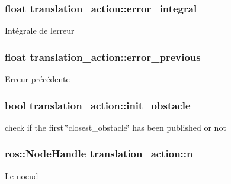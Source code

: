 \subsubsection[{\texorpdfstring{error\+\_\+integral}{error_integral}}]{\setlength{\rightskip}{0pt plus 5cm}float translation\+\_\+action\+::error\+\_\+integral\hspace{0.3cm}{\ttfamily [private]}}\hypertarget{classtranslation__action_a08c753f34a47c55ae61a7e2f1533b3cf}{}\label{classtranslation__action_a08c753f34a47c55ae61a7e2f1533b3cf}
Intégrale de l\textquotesingle{}erreur 
\subsubsection[{\texorpdfstring{error\+\_\+previous}{error_previous}}]{\setlength{\rightskip}{0pt plus 5cm}float translation\+\_\+action\+::error\+\_\+previous\hspace{0.3cm}{\ttfamily [private]}}\hypertarget{classtranslation__action_aa3ac2f4fc74779444d7dcf4c6b92ec11}{}\label{classtranslation__action_aa3ac2f4fc74779444d7dcf4c6b92ec11}
Erreur précédente 
\subsubsection[{\texorpdfstring{init\+\_\+obstacle}{init_obstacle}}]{\setlength{\rightskip}{0pt plus 5cm}bool translation\+\_\+action\+::init\+\_\+obstacle\hspace{0.3cm}{\ttfamily [private]}}\hypertarget{classtranslation__action_a27a6e128fa79d4e87a4d28f5fcb163dc}{}\label{classtranslation__action_a27a6e128fa79d4e87a4d28f5fcb163dc}
check if the first \char`\"{}closest\+\_\+obstacle\char`\"{} has been published or not 
\subsubsection[{\texorpdfstring{n}{n}}]{\setlength{\rightskip}{0pt plus 5cm}ros\+::\+Node\+Handle translation\+\_\+action\+::n\hspace{0.3cm}{\ttfamily [private]}}\hypertarget{classtranslation__action_a778b85167923da6ca704d6acfa7947ed}{}\label{classtranslation__action_a778b85167923da6ca704d6acfa7947ed}
Le noeud 
